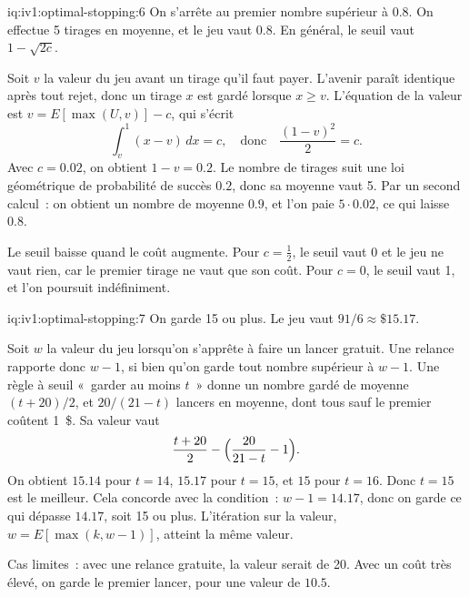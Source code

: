 \begin{solution}{iq:iv1:optimal-stopping:6}
On s'arrête au premier nombre supérieur à $0.8$. On effectue 5 tirages en moyenne, et le jeu vaut $0.8$. En général, le seuil vaut $1 - \sqrt{2c}$.

Soit $v$ la valeur du jeu avant un tirage qu'il faut payer. L'avenir paraît identique après tout rejet, donc un tirage $x$ est gardé lorsque $x \ge v$. L'équation de la valeur est $v = E[\max(U, v)] - c$, qui s'écrit
\[
\int_v^1 (x - v)\,dx = c, \quad\text{donc}\quad \frac{(1 - v)^2}{2} = c.
\]
Avec $c = 0.02$, on obtient $1 - v = 0.2$. Le nombre de tirages suit une loi géométrique de probabilité de succès $0.2$, donc sa moyenne vaut 5. Par un second calcul~: on obtient un nombre de moyenne $0.9$, et l'on paie $5 \cdot 0.02$, ce qui laisse $0.8$.

Le seuil baisse quand le coût augmente. Pour $c = \tfrac12$, le seuil vaut 0 et le jeu ne vaut rien, car le premier tirage ne vaut que son coût. Pour $c = 0$, le seuil vaut 1, et l'on poursuit indéfiniment.

\end{solution}

\begin{solution}{iq:iv1:optimal-stopping:7}
On garde 15 ou plus. Le jeu vaut $91/6 \approx \$15.17$.

Soit $w$ la valeur du jeu lorsqu'on s'apprête à faire un lancer gratuit. Une relance rapporte donc $w - 1$, si bien qu'on garde tout nombre supérieur à $w - 1$. Une règle à seuil «~garder au moins $t$~» donne un nombre gardé de moyenne $(t + 20)/2$, et $20/(21 - t)$ lancers en moyenne, dont tous sauf le premier coûtent 1~\$. Sa valeur vaut
\[
\frac{t + 20}{2} - \Bigl(\frac{20}{21 - t} - 1\Bigr).
\]
On obtient $15.14$ pour $t = 14$, $15.17$ pour $t = 15$, et $15$ pour $t = 16$. Donc $t = 15$ est le meilleur. Cela concorde avec la condition~: $w - 1 = 14.17$, donc on garde ce qui dépasse $14.17$, soit 15 ou plus. L'itération sur la valeur, $w = E[\max(k, w - 1)]$, atteint la même valeur.

Cas limites~: avec une relance gratuite, la valeur serait de 20. Avec un coût très élevé, on garde le premier lancer, pour une valeur de $10.5$.

\end{solution}

